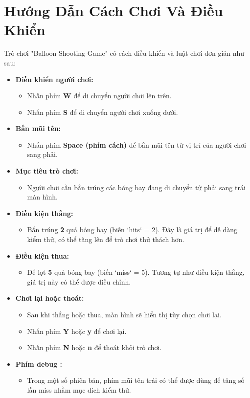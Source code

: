 \documentclass[12pt,a4paper,openany,oneside]{report}
\begin{document}
\chapter{Hướng Dẫn Cách Chơi Và Điều Khiển}
Trò chơi "Balloon Shooting Game" có cách điều khiển và luật chơi đơn giản như sau:
\begin{itemize}
    \item \textbf{Điều khiển người chơi:}
    \begin{itemize}
        \item Nhấn phím \textbf{W} để di chuyển người chơi lên trên.
        \item Nhấn phím \textbf{S} để di chuyển người chơi xuống dưới.
    \end{itemize}
    \item \textbf{Bắn mũi tên:}
    \begin{itemize}
        \item Nhấn phím \textbf{Space (phím cách)} để bắn mũi tên từ vị trí của người chơi sang phải.
    \end{itemize}
    \item \textbf{Mục tiêu trò chơi:}
    \begin{itemize}
        \item Người chơi cần bắn trúng các bóng bay đang di chuyển từ phải sang trái màn hình.
    \end{itemize}
    \item \textbf{Điều kiện thắng:}
    \begin{itemize}
        \item Bắn trúng \textbf{2} quả bóng bay (biến `hits` = 2). Đây là giá trị để dễ dàng kiểm thử, có thể tăng lên để trò chơi thử thách hơn.
    \end{itemize}
    \item \textbf{Điều kiện thua:}
    \begin{itemize}
        \item Để lọt \textbf{5} quả bóng bay (biến `miss` = 5). Tương tự như điều kiện thắng, giá trị này có thể được điều chỉnh.
    \end{itemize}
    \item \textbf{Chơi lại hoặc thoát:}
    \begin{itemize}
        \item Sau khi thắng hoặc thua, màn hình sẽ hiển thị tùy chọn chơi lại.
        \item Nhấn phím \textbf{Y} hoặc \textbf{y} để chơi lại.
        \item Nhấn phím \textbf{N} hoặc \textbf{n} để thoát khỏi trò chơi.
    \end{itemize}
    \item \textbf{Phím debug :}
    \begin{itemize}
        \item Trong một số phiên bản, phím mũi tên trái có thể được dùng để tăng số lần miss nhằm mục đích kiểm thử.
    \end{itemize}
\end{itemize}
\end{document}
